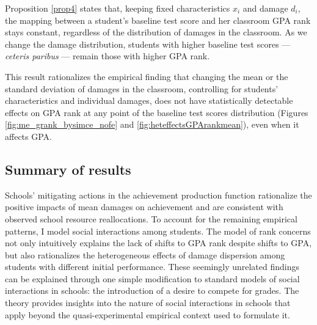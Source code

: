 Proposition \ref{prop4} states that, keeping fixed characteristics $x_i$ and damage $d_i$, the mapping between a student's baseline test score and her classroom GPA rank stays constant, regardless of the distribution of damages in the classroom. As we change the damage distribution, students with higher baseline test scores --- {\itshape ceteris paribus} --- remain those with higher GPA rank. \par 
This result rationalizes the empirical finding that changing the mean or the standard deviation of damages in the classroom, controlling for students' characteristics and individual damages, does not have statistically detectable effects on GPA rank at any point of the baseline test scores distribution (Figures \ref{fig:me_grank_bysimce_nofe} and \ref{fig:heteffectsGPArankmean}), even when it affects GPA.\par 

\subsection{Summary of results}
 Schools' mitigating actions in the achievement production function rationalize the positive impacts of mean damages on achievement and are consistent with observed school resource reallocations. To account for the remaining empirical patterns, I model social interactions among students. The model of rank concerns not only intuitively explains the lack of shifts to GPA rank despite shifts to GPA, but also rationalizes the heterogeneous effects of damage dispersion among students with different initial performance. These seemingly unrelated findings can be explained through one simple modification to standard models of social interactions in schools: the introduction of a desire to compete for grades. The theory provides insights into the nature of social interactions in schools that apply beyond the quasi-experimental empirical context used to formulate it. \par 
